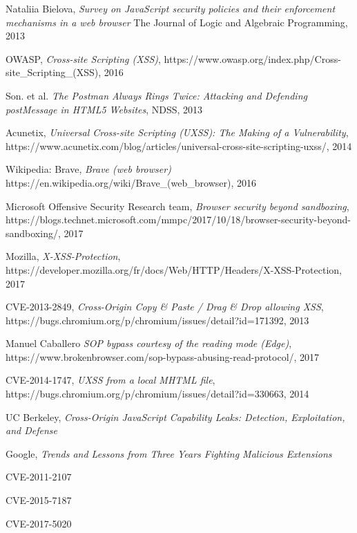 \documentclass[journal]{IEEEtran}
\begin{document}
\begin{thebibliography}{1}
Nataliia Bielova,
\textit{Survey on JavaScript security policies and their enforcement mechanisms in a web browser}
The Journal of Logic and Algebraic Programming, 2013

OWASP,
\textit{Cross-site Scripting (XSS)},
https://www.owasp.org/index.php/Cross-site\_Scripting\_(XSS),
2016

Son. et al. 
\textit{The Postman Always Rings Twice: Attacking and Defending postMessage in HTML5 Websites}, 
NDSS, 2013

Acunetix,
\textit{Universal Cross-site Scripting (UXSS): The Making of a Vulnerability},
https://www.acunetix.com/blog/articles/universal-cross-site-scripting-uxss/,
2014

Wikipedia: Brave,
\textit{Brave (web browser)}
https://en.wikipedia.org/wiki/Brave\_(web\_browser),
2016

Microsoft Offensive Security Research team,
\textit{Browser security beyond sandboxing},
https://blogs.technet.microsoft.com/mmpc/2017/10/18/browser-security-beyond-sandboxing/,
2017

Mozilla,
\textit{X-XSS-Protection},
https://developer.mozilla.org/fr/docs/Web/HTTP/Headers/X-XSS-Protection,
2017

CVE-2013-2849,
\textit{Cross-Origin Copy \& Paste / Drag \& Drop allowing XSS},
https://bugs.chromium.org/p/chromium/issues/detail?id=171392,
2013

Manuel Caballero
\textit{SOP bypass courtesy of the reading mode (Edge)},
https://www.brokenbrowser.com/sop-bypass-abusing-read-protocol/,
2017

CVE-2014-1747,
\textit{UXSS from a local MHTML file},
https://bugs.chromium.org/p/chromium/issues/detail?id=330663,
2014

UC Berkeley,
\textit{Cross-Origin JavaScript Capability Leaks: Detection, Exploitation, and Defense}


Google,
\textit{Trends and Lessons from Three Years Fighting Malicious Extensions}

CVE-2011-2107

CVE-2015-7187

CVE-2017-5020


\end{thebibliography}
\end{document}

